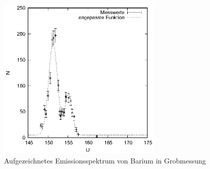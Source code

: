 \begin{figure}[h]
  \centering
  \includegraphics[width=0.7\textwidth]{data/Ba_grob.eps}
  \caption{Aufgezeichnetes Emissionsspektrum von Barium in Grobmessung}
  \label{fig:ba_grob}
\end{figure}

